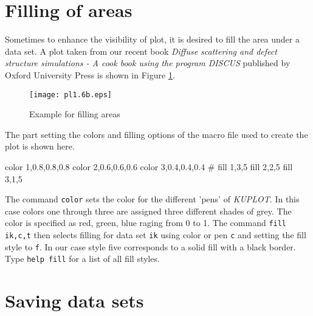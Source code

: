 
\section{Filling of areas\label{1d-fill}}

Sometimes to enhance the visibility of plot, it is desired to fill
the area under a data set. A plot taken from our recent book {\it
Diffuse scattering and defect structure simulations - A cook book
using the program DISCUS} published by Oxford University Press is
shown in Figure \ref{pl1-fig6b}.
%
\begin{figure}[!tb]
   \centering
   \texttt{[image: pl1.6b.eps]}
   \caption{Example for filling areas}
   \label{pl1-fig6b}
\end{figure}

The part setting the colors and filling options of the macro file
used to create the plot is shown here.

\begin{MacVerbatim}
   color 1,0.8,0.8,0.8
   color 2,0.6,0.6,0.6
   color 3,0.4,0.4,0.4
   #
   fill 1,3,5
   fill 2,2,5
   fill 3,1,5
\end{MacVerbatim}
%
The command {\tt color} sets the color for the different 'pens' of
{\it KUPLOT}. In this case colors one through three are assigned
three different shades of grey. The color is specified as red,
green, blue raging from 0 to 1. The command {\tt fill ik,c,t} then
selects filling for data set {\tt ik} using color or pen {\tt c} and
setting the fill style to {\tt f}. In our case style five
corresponds to a solid fill with a black border. Type {\tt help
fill} for a list of all fill styles.


\section{Saving data sets \label{1d-save}}

